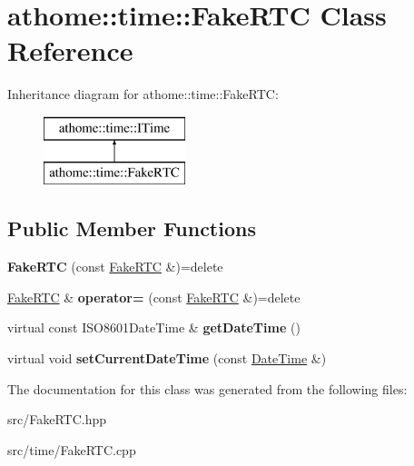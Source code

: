 \hypertarget{classathome_1_1time_1_1_fake_r_t_c}{}\section{athome\+:\+:time\+:\+:Fake\+R\+TC Class Reference}
\label{classathome_1_1time_1_1_fake_r_t_c}
Inheritance diagram for athome\+:\+:time\+:\+:Fake\+R\+TC\+:\begin{figure}[H]
\begin{center}
\leavevmode
\includegraphics[height=2.000000cm]{classathome_1_1time_1_1_fake_r_t_c}
\end{center}
\end{figure}
\subsection*{Public Member Functions}
\begin{DoxyCompactItemize}
\item 
\mbox{\label{classathome_1_1time_1_1_fake_r_t_c_a43e43ca95a5bbe16723030e1b67bd1ff}} 
{\bfseries Fake\+R\+TC} (const \mbox{\hyperlink{classathome_1_1time_1_1_fake_r_t_c}{Fake\+R\+TC}} \&)=delete
\item 
\mbox{\label{classathome_1_1time_1_1_fake_r_t_c_ac7add5dcf5c8ef8112fc53c2e9a32778}} 
\mbox{\hyperlink{classathome_1_1time_1_1_fake_r_t_c}{Fake\+R\+TC}} \& {\bfseries operator=} (const \mbox{\hyperlink{classathome_1_1time_1_1_fake_r_t_c}{Fake\+R\+TC}} \&)=delete
\item 
\mbox{\label{classathome_1_1time_1_1_fake_r_t_c_a1559ff8bd889bdf02a40d3501864c6db}} 
virtual const I\+S\+O8601\+Date\+Time \& {\bfseries get\+Date\+Time} ()
\item 
\mbox{\label{classathome_1_1time_1_1_fake_r_t_c_ab8565c9e7b300bf431cd0d636ad225b7}} 
virtual void {\bfseries set\+Current\+Date\+Time} (const \mbox{\hyperlink{classathome_1_1time_1_1_i_time_1_1_date_time}{Date\+Time}} \&)
\end{DoxyCompactItemize}


The documentation for this class was generated from the following files\+:\begin{DoxyCompactItemize}
\item 
src/Fake\+R\+T\+C.\+hpp\item 
src/time/Fake\+R\+T\+C.\+cpp\end{DoxyCompactItemize}
